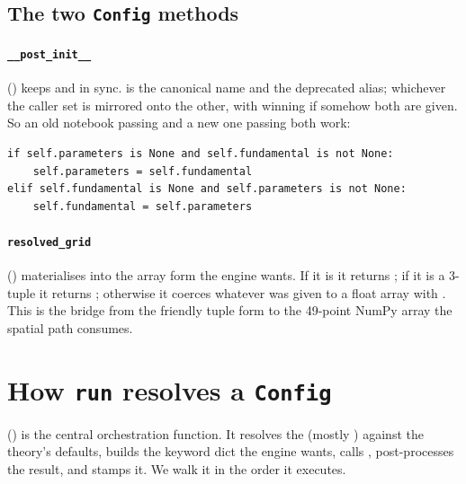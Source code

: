 \subsection{The two \texttt{Config} methods}

\paragraph{\texttt{\_\_post\_init\_\_}} ()
keeps  and  in sync.  is the
canonical name and  the deprecated alias; whichever the caller
set is mirrored onto the other, with  winning if somehow both
are given. So an old notebook passing  and a new one
passing  both work:

\begin{lstlisting}
if self.parameters is None and self.fundamental is not None:
    self.parameters = self.fundamental
elif self.fundamental is None and self.parameters is not None:
    self.fundamental = self.parameters
\end{lstlisting}

\paragraph{\texttt{resolved\_grid}} ()
materialises  into the array form the engine wants. If it is
 it returns ; if it is a 3-tuple  it
returns ; otherwise it coerces whatever was
given to a float array with . This is the bridge
from the friendly tuple form  to the 49-point NumPy array the
spatial path consumes.

\section{How \texttt{run} resolves a \texttt{Config}}\label{sec:run}

 () is
the central orchestration function. It resolves the (mostly )
 against the theory's defaults, builds the keyword dict the engine
wants, calls , post-processes the result, and stamps it.
We walk it in the order it executes.

